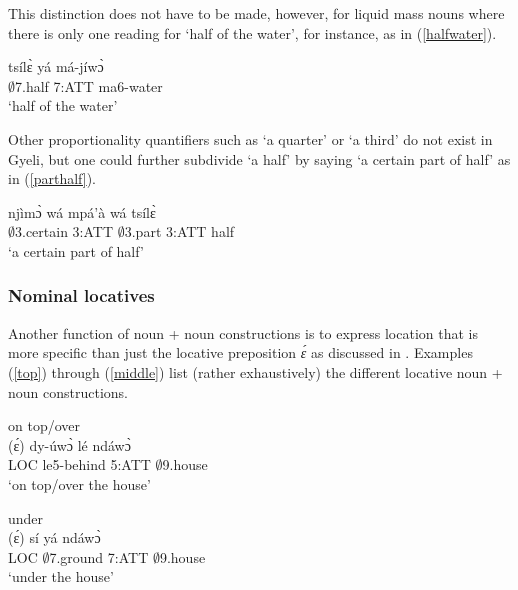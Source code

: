 \noindent This distinction does not have to be made, however, for liquid mass nouns where there is only one reading for `half of the water', for instance, as in (\ref{halfwater}).

\begin{exe}
\ex\label{halfwater}
  \gll     tsílɛ̀ yá má-jíwɔ̀ \\
                $\emptyset$7.half 7:ATT ma6-water \\
    \trans `half of the water'
\end {exe}

Other proportionality quantifiers such as `a quarter' or `a third' do not exist in Gyeli, but one could further subdivide `a half' by saying `a certain part of half' as in (\ref{parthalf}).

\begin{exe}
\ex\label{parthalf}
  \gll     njìmɔ̀ wá mpá'à wá tsílɛ̀ \\
                $\emptyset$3.certain 3:ATT $\emptyset$3.part 3:ATT half \\
    \trans `a certain part of half'
\end {exe}


\subsubsection{Nominal locatives}  
\label{sec:NomLOC}

Another function of noun + noun constructions is to express location that is more specific than just the locative preposition {\itshape ɛ́} as discussed in . Examples (\ref{top}) through (\ref{middle}) list (rather exhaustively) the different locative noun + noun constructions.

\begin{exe}
\ex\label{top} on top/over \\
  \gll (ɛ́) dy-úwɔ̀ lé ndáwɔ̀     \\
           LOC     le5-behind 5:ATT $\emptyset$9.house \\
    \trans `on top/over the house'
\end {exe}

\begin{exe}
\ex\label{under} under \\
  \gll (ɛ́) sí yá ndáwɔ̀     \\
           LOC     $\emptyset$7.ground 7:ATT $\emptyset$9.house \\ 
    \trans `under the house'
\end {exe}

